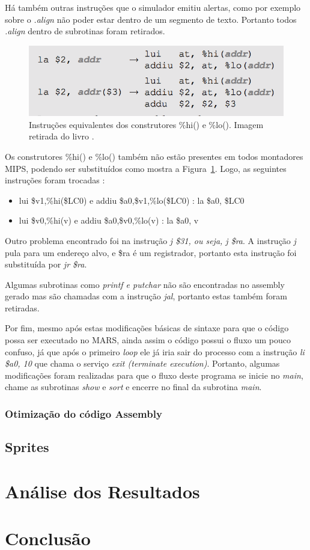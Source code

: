 \documentclass[12pt]{article}
\begin{document}
Há também outras instruções que o simulador emitiu alertas, como por exemplo sobre o \textit{.align} não poder estar dentro de um segmento de texto. Portanto todos \textit{.align} dentro de subrotinas foram retirados.

\begin{figure}[H]
	\centering
	\includegraphics[width=1\textwidth]{hilo.png}
	\caption{Instruções equivalentes dos construtores \%hi() e \%lo(). Imagem retirada do livro \cite{mipsrun}.}
	\label{fig:hilo}
\end{figure}

Os construtores \%hi() e \%lo() também não estão presentes em todos montadores MIPS, podendo ser substituídos como mostra a Figura~\ref{fig:hilo}. Logo, as seguintes instruções foram trocadas :

\begin{itemize}
	\item lui \$v1,\%hi(\$LC0) e addiu \$a0,\$v1,\%lo(\$LC0) : la \$a0, \$LC0
    \item lui \$v0,\%hi(v) e addiu \$a0,\$v0,\%lo(v) : la \$a0, v
\end{itemize}

Outro problema encontrado foi na instrução \textit{j \$31, ou seja, j \$ra}. A instrução \textit{j} pula para um endereço alvo, e \$ra é um registrador, portanto esta instrução foi substituída por \textit{jr \$ra}.

Algumas subrotinas como \textit{printf e putchar} não são encontradas no assembly gerado mas são chamadas com a instrução \textit{jal}, portanto estas também foram retiradas.

Por fim, mesmo após estas modificações básicas de sintaxe para que o código possa ser executado no MARS, ainda assim o código possui o fluxo um pouco confuso, já que após o primeiro \textit{loop} ele já iria sair do processo com a instrução \textit{li \$a0, 10} que chama o serviço \textit{exit (terminate execution)}. Portanto, algumas modificações foram realizadas para que o fluxo deste programa se inicie no \textit{main}, chame as subrotinas \textit{show} e \textit{sort} e encerre no final da subrotina \textit{main}.

\subsubsection{Otimização do código Assembly}
\label{subsubsec:ot}

\subsection{Sprites}
\label{subsec:sprites}

\section{Análise dos Resultados}
\label{sec:Resultados}

\section{Conclusão}
\label{sec:Conclusao}


  
\end{document}
